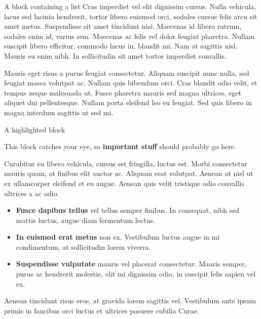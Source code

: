 \begin{frame}[t]
\begin{columns}[t]
\begin{column}{\colwidth}
\begin{block}{A block containing a list}
    Cras imperdiet vel elit dignissim cursus. Nulla vehicula, lacus sed lacinia
    hendrerit, tortor libero euismod orci, sodales cursus felis arcu sit amet
    metus. Suspendisse sit amet tincidunt nisi. Maecenas id libero rutrum,
    sodales enim id, varius sem. Maecenas ac felis vel dolor feugiat pharetra.
    Nullam suscipit libero efficitur, commodo lacus in, blandit mi. Nam at
    sagittis nisl. Mauris eu enim nibh. In sollicitudin sit amet tortor
    imperdiet convallis.

    Mauris eget risus a purus feugiat consectetur. Aliquam suscipit nunc
    nulla, sed feugiat massa volutpat ac. Nullam quis bibendum orci. Cras
    blandit odio velit, et tempus neque malesuada ut. Fusce pharetra mauris
    sed magna ultrices, eget aliquet dui pellentesque. Nullam porta eleifend
    leo eu feugiat. Sed quis libero in magna interdum sagittis ut sed mi.

  \end{block}

  \begin{alertblock}{A highlighted block}

    This block catches your eye, so \textbf{important stuff} should probably go
    here.

    Curabitur eu libero vehicula, cursus est fringilla, luctus est. Morbi
    consectetur mauris quam, at finibus elit auctor ac. Aliquam erat volutpat.
    Aenean at nisl ut ex ullamcorper eleifend et eu augue. Aenean quis velit
    tristique odio convallis ultrices a ac odio.

    \begin{itemize}
      \item \textbf{Fusce dapibus tellus} vel tellus semper finibus. In
        consequat, nibh sed mattis luctus, augue diam fermentum lectus.
      \item \textbf{In euismod erat metus} non ex. Vestibulum luctus augue in
        mi condimentum, at sollicitudin lorem viverra.
      \item \textbf{Suspendisse vulputate} mauris vel placerat consectetur.
        Mauris semper, purus ac hendrerit molestie, elit mi dignissim odio, in
        suscipit felis sapien vel ex.
    \end{itemize}

    Aenean tincidunt risus eros, at gravida lorem sagittis vel. Vestibulum ante
    ipsum primis in faucibus orci luctus et ultrices posuere cubilia Curae.

  \end{alertblock}


\end{column}
\end{columns}
\end{frame}
